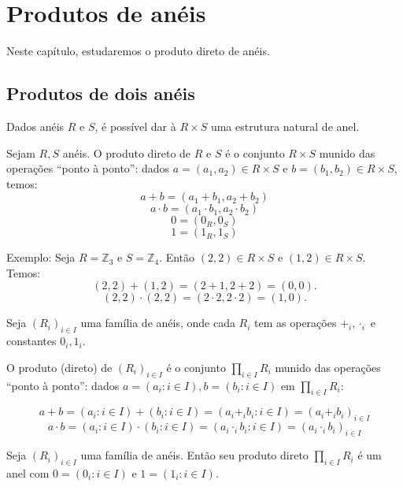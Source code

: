 \chapter{Produtos de anéis}
Neste capítulo, estudaremos o produto direto de anéis.

\section{Produtos de dois anéis}
Dados anéis $R$ e $S$, é possível dar à $R\times S$ uma estrutura natural de anel.
\begin{definition}
    Sejam $R, S$ anéis. O produto direto de $R$ e $S$ é o conjunto $R\times S$ munido das operações ``ponto à ponto'': dados $a=(a_1, a_2)\in R\times S$ e $b=(b_1, b_2)\in R\times S$, temos:
    $$a+b=(a_1+b_1, a_2+b_2)$$
    $$a\cdot b=(a_1\cdot b_1, a_2\cdot b_2)$$
    $$0=(0_R, 0_S)$$
    $$1=(1_R, 1_S)$$
\end{definition}

Exemplo: Seja $R=\mathbb Z_3$ e $S=\mathbb Z_4$. Então $(2, 2)\in R\times S$ e $(1, 2)\in R\times S$. Temos:
$$(2, 2)+(1, 2)=(2+ 1, 2+ 2)=(0, 0).$$
$$(2, 2)\cdot (2, 2)=(2\cdot 2, 2\cdot 2)=(1, 0).$$
\begin{definition}
    Seja $(R_i)_{i \in I}$ uma família de anéis, onde cada $R_i$ tem as operações $+_i, \cdot_i$ e constantes $0_i, 1_i$.
    
    O produto (direto) de $(R_i)_{i \in I}$ é o conjunto $\prod_{i \in I} R_i$ munido das operações ``ponto à ponto'': dados $a=(a_i: i \in I), b=(b_i: i \in I)$ em $\prod_{i \in I}R_i$:

    $$a+b=(a_i: i \in I)+(b_i: i \in I)=(a_i+_i b_i: i \in I)=(a_i+_ib_i)_{i \in I}$$
    $$a\cdot b=(a_i: i \in I)\cdot (b_i: i \in I)=(a_i\cdot _i b_i: i \in I)=(a_i\cdot _ib_i)_{i \in I}$$

\end{definition}

\begin{lemma}
    Seja $(R_i)_{i \in I}$ uma família de anéis. Então seu produto direto $\prod_{i \in I}R_i$ é um anel com $0=(0_i: i \in I)$ e $1=(1_i: i \in I)$.
\end{lemma}

